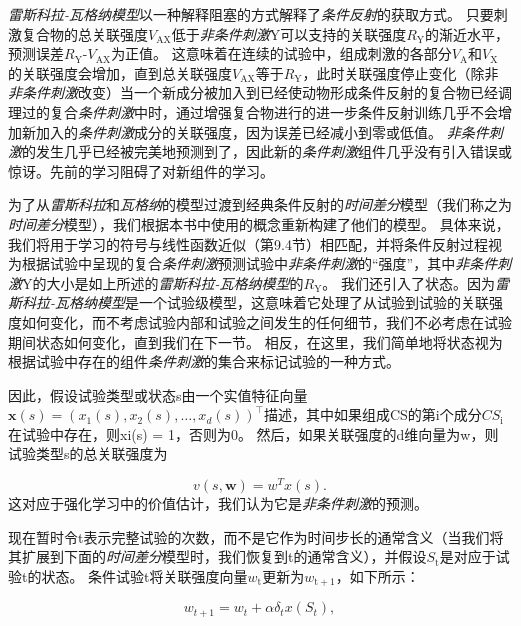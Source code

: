 \textit{雷斯科拉-瓦格纳模型}以一种解释阻塞的方式解释了\textit{条件反射}的获取方式。
只要刺激复合物的总关联强度$V_{\mathrm{AX}}$低于\textit{非条件刺激}Y可以支持的关联强度$R_{\mathrm{Y}}$的渐近水平，预测误差$R_{\mathrm{Y}}$-$V_{\mathrm{AX}}$为正值。
这意味着在连续的试验中，组成刺激的各部分$V_{\mathrm{A}}$和$V_{\mathrm{X}}$的关联强度会增加，直到总关联强度$V_{\mathrm{AX}}$等于$R_{\mathrm{Y}}$，此时关联强度停止变化（除非\textit{非条件刺激}改变）当一个新成分被加入到已经使动物形成条件反射的复合物已经调理过的复合\textit{条件刺激}中时，通过增强复合物进行的进一步条件反射训练几乎不会增加新加入的\textit{条件刺激}成分的关联强度，因为误差已经减小到零或低值。
\textit{非条件刺激}的发生几乎已经被完美地预测到了，因此新的\textit{条件刺激}组件几乎没有引入错误或惊讶。先前的学习阻碍了对新组件的学习。



为了从\textit{雷斯科拉}和\textit{瓦格纳}的模型过渡到经典条件反射的\textit{时间差分}模型（我们称之为\textit{时间差分}模型），我们根据本书中使用的概念重新构建了他们的模型。
具体来说，我们将用于学习的符号与线性函数近似（第9.4节）相匹配，并将条件反射过程视为根据试验中呈现的复合\textit{条件刺激}预测试验中\textit{非条件刺激}的“强度”，其中\textit{非条件刺激}Y的大小是如上所述的\textit{雷斯科拉-瓦格纳模型}的$R_{\mathrm{Y}}$。
我们还引入了状态。因为\textit{雷斯科拉-瓦格纳模型}是一个试验级模型，这意味着它处理了从试验到试验的关联强度如何变化，而不考虑试验内部和试验之间发生的任何细节，我们不必考虑在试验期间状态如何变化，直到我们在下一节。
相反，在这里，我们简单地将状态视为根据试验中存在的组件\textit{条件刺激}的集合来标记试验的一种方式。


因此，假设试验类型或状态s由一个实值特征向量$\mathbf{x}(s)=\left(x_{1}(s), x_{2}(s), \ldots, x_{d}(s)\right)^{\top}$描述，其中如果组成CS的第i个成分$CS_{\mathrm{i}}$在试验中存在，则xi(s) = 1，否则为0。
然后，如果关联强度的d维向量为w，则试验类型s的总关联强度为

\begin{equation}\label{key}
	v(s, \textbf{w}) = 
	w^T x(s).
\end{equation}
这对应于强化学习中的价值估计，我们认为它是\textit{非条件刺激}的预测。

现在暂时令t表示完整试验的次数，而不是它作为时间步长的通常含义（当我们将其扩展到下面的\textit{时间差分}模型时，我们恢复到t的通常含义），并假设$S_{\mathrm{t}}$是对应于试验t的状态。
条件试验t将关联强度向量$w_{\mathrm{t}}$更新为$w_{\mathrm{t+1}}$，如下所示：

\begin{equation}\label{key}
	w_{t+1} = w_t + \alpha \delta_t x(S_t),
\end{equation}

